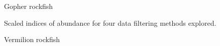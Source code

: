 \documentclass[
  12pt,
  authoryear,
  preprint,
  3p]{elsarticle}
\begin{document}
\begin{figure}
\begin{minipage}[t]{0.50\linewidth}
{\centering 


\caption{\label{fig-gopher-indices}Gopher rockfish}

}

\end{minipage}%
%
\begin{minipage}[t]{0.50\linewidth}

{\centering 


\caption{\label{fig-vermilion-indices}Vermilion rockfish}

}

\end{minipage}%
\newline
\begin{minipage}[t]{0.50\linewidth}

{\centering 

Scaled indices of abundance for four data filtering methods explored.

}

\end{minipage}%

\end{figure}
\end{document}
